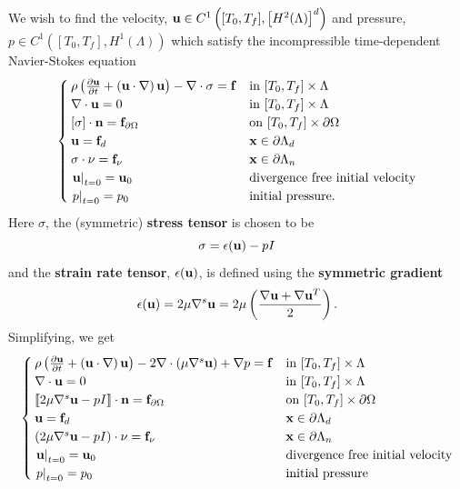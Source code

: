 \documentclass[letterpaper]{erdc}
\begin{document}
We wish to find the velocity,
$\textbf{u}\in C^{1}\left([T_0,T_f], \left[H^{2}(\Lambda)\right]^d\right)$ and
pressure, $p\in C^{1}\left([T_0,T_f],H^{1}(\Lambda)\right)$ which satisfy the
incompressible time-dependent Navier-Stokes equation
\begin{equation}\label{eq:nspde01}
  \begin{cases}
		\rho\left(\frac{\partial \textbf{u}}{\partial t} + \left(\textbf{u}\cdot\nabla\right)\textbf{u}  \right) - \nabla\cdot \sigma = \mathbf{f} & \mbox{in }[T_0,T_f]\times\Lambda\\
		\nabla\cdot \textbf{u} = 0 & \mbox{in }[T_0,T_f]\times\Lambda\\
		\left[\sigma \right]\cdot\textbf{n} = \mathbf{f}_{\partial\Omega}  & \mbox{on }[T_0,T_f]\times\partial\Omega \\
		\textbf{u} = \mathbf{f}_d  & \textbf{x} \in\partial\Lambda_{d}\\
		\sigma\cdot\nu = \mathbf{f}_{\nu} & \textbf{x}\in \partial\Lambda_{n}\\
		\left.\textbf{u}\right|_{t=0} = \textbf{u}_{0} & \mbox{divergence free initial velocity}\\
		\left.p\right|_{t=0} = p_0 & \mbox{initial pressure.}
	\end{cases}
\end{equation}
Here $\sigma$, the (symmetric) \textbf{stress tensor} is chosen to be
\begin{equation}
	 \sigma = \epsilon(\textbf{u}) - pI
\end{equation}
and the \textbf{strain rate tensor}, $\epsilon(\textbf{u})$, is defined
using the \textbf{symmetric gradient}
\begin{equation}
	\epsilon(\textbf{u}) = 2\mu \nabla^{s} \textbf{u} = 2\mu\left(\frac{\nabla\textbf{u} + \nabla\textbf{u}^{T}}{2}\right).
\end{equation}
 Simplifying, we get
\begin{equation}\label{eq:nspde02}
  \begin{cases}
		\rho\left(\frac{\partial \textbf{u}}{\partial t} + \left(\textbf{u}\cdot\nabla\right)\textbf{u}  \right) - 2\nabla\cdot\left(\mu \nabla^{s}\textbf{u} \right) + \nabla p = \mathbf{f} & \mbox{in }[T_0,T_f]\times\Lambda\\
		\nabla\cdot \textbf{u} = 0 & \mbox{in }[T_0,T_f]\times\Lambda\\
		\left\llbracket 2\mu\nabla^{s}\textbf{u} - p I \right\rrbracket\cdot\textbf{n} = \mathbf{f}_{\partial\Omega}  & \mbox{on }[T_0,T_f]\times\partial\Omega \\
		\textbf{u} = \mathbf{f}_d  & \textbf{x} \in\partial\Lambda_{d}\\
		\left(2\mu\nabla^{s}\textbf{u}-p I\right)\cdot\nu = \mathbf{f}_{\nu} & \textbf{x}\in \partial\Lambda_{n}\\
		\left.\textbf{u}\right|_{t=0} = \textbf{u}_{0} & \mbox{divergence free initial velocity} \\
		\left.p\right|_{t=0} = p_0 & \mbox{initial pressure}
	\end{cases}
\end{equation}
\end{document}
